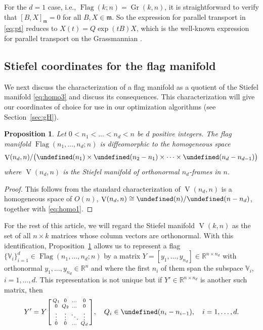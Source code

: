 \documentclass[11pt,reqno]{amsart}%
\newtheorem{proposition}[theorem]{Proposition}
\theoremstyle{definition}
\theoremstyle{remark}
\let\O\undefined
\DeclareMathOperator{\Gr}{Gr}
\DeclareMathOperator{\V}{V}
\DeclareMathOperator{\Flag}{Flag}
\DeclareMathOperator{\O}{O}
\begin{document}
For the $d= 1$ case, i.e., $\Flag(k;n) = \Gr(k,n)$, it is straightforward to verify that $[B,X]_\mathfrak{m} = 0$ for all $B,X\in \mathfrak{m}$. So the expression for parallel transport in \eqref{eq:pt} reduces to $X(t) = Q \exp(tB) X$, which is the well-known expression for parallel transport on the Grassmannian \cite{EAS}.

\subsection{Stiefel coordinates for the flag manifold}\label{sec:stief}

We next discuss the characterization of a flag manifold as a quotient of the Stiefel manifold \eqref{eq:homo3} and discuss  its consequences. This characterization will give our coordinates of choice for use in our optimization algorithms  (see Section~\ref{sec:gH}).
\begin{proposition}\label{prop:Stiefel}
Let $0 < n_1< \dots < n_d < n$ be  $d$ positive integers. The flag manifold $\Flag(n_1,\dots, n_d;n)$ is diffeomorphic to the homogeneous space
\begin{equation}\label{prop:Stiefel:eqn1}
\V(n_d,n) / \bigl(\O(n_1) \times \O(n_2-n_1) \times \dots \times \O(n_d- n_{d-1})\bigr)
\end{equation}
where $\V(n_d,n)$ is the Stiefel manifold of orthonormal $n_d$-frames in $n$. 
\end{proposition}
\begin{proof}
This follows from the standard characterization of $\V(n_d,n)$ is a homogeneous space of $O(n)$,
$\V(n_d,n) \cong  \O(n)/\O(n-n_d)$,  together with \eqref{eq:homo1}.
\end{proof}
For the rest of this article, we will regard the Stiefel manifold $\V(k,n)$ as the set of all $n\times k$ matrices whose column vectors are orthonormal. With this identification, Proposition~\ref{prop:Stiefel} allows us to represent a flag $\{ \mathbb{V}_i\}_{i=1}^d \in \Flag(n_1,\dots, n_d;n)$ by a  matrix $Y =[y_1,\dots,y_{n_d}] \in \mathbb{R}^{n\times n_d}$ with orthonormal $y_1,\dots,y_{n_d} \in \mathbb{R}^n$ and where the first $n_i$ of them span the subspace $\mathbb{V}_i$, $i=1,\dots, d$. This representation is not unique but if $Y'\in \mathbb{R}^{n\times n_d} $ is another such matrix, then 
\begin{equation}\label{eq:rep}
Y' = Y \begin{bsmallmatrix}
Q_1 & 0 & \dots & 0\\
0 & Q_2 &\dots & 0 \\
\vdots & \vdots & \ddots & \vdots \\
0 & 0 &\dots & Q_{d}
\end{bsmallmatrix},
\quad Q_i \in \O(n_i - n_{i-1}), \quad i =1,\dots, d.
\end{equation}
\end{document}
